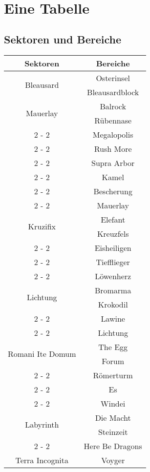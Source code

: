 \documentclass{article}%
\begin{document}
%
\section{Eine Tabelle}%
\label{sec:EineTabelle}%
\subsection{Sektoren und Bereiche}%
\label{subsec:SektorenundBereiche}%
\begin{tabular}{|c|c|}%
\hline%
Sektoren&Bereiche\\%
\hline%
\multirow{2}{*}{Bleausard}&Osterinsel\\%
\cline{2%
-%
2}%
&Bleausardblock\\%
\hline%
\multirow{2}{*}{Mauerlay}&Balrock\\%
\cline{2%
-%
2}%
&Rübennase\\%
\cline{2%
-%
2}%
&Megalopolis\\%
\cline{2%
-%
2}%
&Rush More\\%
\cline{2%
-%
2}%
&Supra Arbor\\%
\cline{2%
-%
2}%
&Kamel\\%
\cline{2%
-%
2}%
&Bescherung\\%
\cline{2%
-%
2}%
&Mauerlay\\%
\hline%
\multirow{2}{*}{Kruzifix}&Elefant\\%
\cline{2%
-%
2}%
&Kreuzfels\\%
\cline{2%
-%
2}%
&Eisheiligen\\%
\cline{2%
-%
2}%
&Tiefflieger\\%
\cline{2%
-%
2}%
&Löwenherz\\%
\hline%
\multirow{2}{*}{Lichtung}&Bromarma\\%
\cline{2%
-%
2}%
&Krokodil\\%
\cline{2%
-%
2}%
&Lawine\\%
\cline{2%
-%
2}%
&Lichtung\\%
\hline%
\multirow{2}{*}{Romani Ite Domum}&The Egg\\%
\cline{2%
-%
2}%
&Forum\\%
\cline{2%
-%
2}%
&Römerturm\\%
\cline{2%
-%
2}%
&Es\\%
\cline{2%
-%
2}%
&Windei\\%
\hline%
\multirow{2}{*}{Labyrinth}&Die Macht\\%
\cline{2%
-%
2}%
&Steinzeit\\%
\cline{2%
-%
2}%
&Here Be Dragons\\%
\hline%
\multirow{2}{*}{Terra Incognita}&Voyger\\%

\end{tabular}
\end{document}
